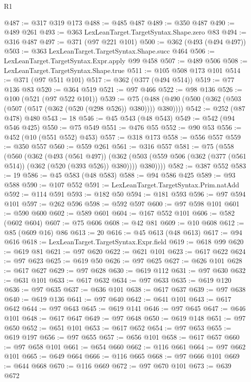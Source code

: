 \begin{lexlean}{R1}
\begin{coremodule}
@487 := @317 @319 @173
@488 := @485 @487
@489 := @350 @487
@490 := @489 @261
@493 := @363 LexLeanTarget.TargetSyntax.Shape.zero @83
@494 := @316 @487
@497 := @371 (@97 @221 @101)
@500 := @362 (@493 (@494 @497))
@503 := @363 LexLeanTarget.TargetSyntax.Shape.succ @464
@506 := LexLeanTarget.TargetSyntax.Expr.apply @99 @458
@507 := @489 @506
@508 := LexLeanTarget.TargetSyntax.Shape.true
@511 := @105 @508 @173 @101
@514 := @371 (@97 @511 @101)
@517 := @362 (@377 (@494 @514))
@519 := @77 @136 @83
@520 := @364 @519
@521 := @97 @466
@522 := @98 @136
@526 := @100 (@521 (@97 @522 @101))
@539 := @75 (@488 (@490 (@500 (@362 (@503 (@507 (@517 (@362 (@520 (@298 @526)) @380)))) @380))))
@542 := @252 (@87 @478) @480
@543 := 18
@546 := @45 @543 (@48 @543)
@549 := @542 (@94 @546 @425)
@550 := @75 @549
@551 := @476 @55
@552 := @90 @53
@556 := @452 (@10 (@551 @552) @453)
@557 := @318 @173
@558 := @556 @557
@559 := @350 @557
@560 := @559 @261
@561 := @316 @557
@581 := @75
    (@558
      (@560
        (@362
          (@493 (@561 @497))
          (@362 (@503 (@559 @506 (@362 (@377 (@561 @514)) (@362 (@520 (@393 @526)) @380)))) @380))))
@582 := @387 @552
@583 := 19
@586 := @45 @583 (@48 @583)
@588 := @94 @586 @425
@589 := @93 @588
@590 := @107 @552
@591 := LexLeanTarget.TargetSyntax.Prim.natAdd
@592 := @114 @591
@593 := @182 @50
@594 := @181 @593
@596 := @97 @594 @101
@597 := @262 @596
@598 := @592 @597
@600 := @97 @598 @101
@601 := @590 @600
@602 := @589 @601
@604 := @167 @552 @101
@606 := @582 (@602 @604)
@607 := @75 @606
@608 := @42 @81
@609 := @10 @608
@612 := @85 (@609 @16) @86
@613 := 20
@616 := @45 @613 (@48 @613)
@617 := @94 @616
@618 := LexLeanTarget.TargetSyntax.Expr.field
@619 := @618 @99
@620 := @619 @81
@621 := @97 @620
@622 := @621 @101
@623 := @617 @622
@624 := @97 @623
@625 := @619 @50
@626 := @97 @625
@627 := @626 @101
@628 := @617 @627
@629 := @97 @628
@630 := @619 @112
@631 := @97 @630
@632 := @631 @101
@633 := @617 @632
@634 := @97 @633
@635 := @619 @120
@636 := @97 @635
@637 := @636 @101
@638 := @617 @637
@639 := @97 @638
@640 := @619 @136
@641 := @97 @640
@642 := @641 @101
@643 := @617 @642
@644 := @97 @643
@645 := @619 @141
@646 := @97 @645
@647 := @646 @101
@648 := @617 @647
@649 := @97 @648
@650 := @619 @148
@651 := @97 @650
@652 := @651 @101
@653 := @617 @652
@654 := @97 @653
@655 := @619 @197
@656 := @97 @655
@657 := @656 @101
@658 := @617 @657
@660 := @97 @658 @101
@661 := @654 @660
@662 := @116 @661
@664 := @97 @662 @101
@665 := @649 @664
@666 := @116 @665
@668 := @97 @666 @101
@669 := @644 @668
@670 := @116 @669
@672 := @97 @670 @101
@673 := @639 @672

\end{coremodule}
\end{lexlean}
